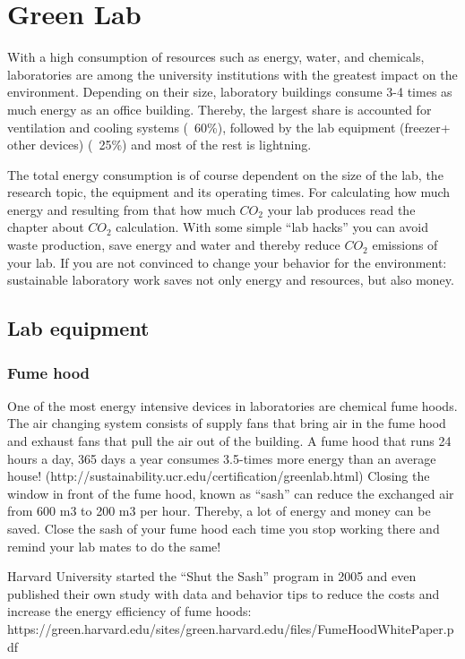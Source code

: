 
\chapter{Green Lab}\label{chap:lab}

With a high consumption of resources such as energy, water, and chemicals, laboratories are among the university institutions with the greatest impact on the environment. Depending on their size, laboratory buildings consume 3-4 times as much energy as an office building. Thereby, the largest share is accounted for ventilation and cooling systems (~60\%), followed by the lab equipment (freezer+ other devices) (~25\%) and most of the rest is lightning. 

The total energy consumption is of course dependent on the size of the lab, the research topic, the equipment and its operating times. For calculating how much energy and resulting from that how much $CO_2$ your lab produces read the chapter about $CO_{2}$ calculation. 
With some simple “lab hacks” you can avoid waste production, save energy and water and thereby reduce $CO_{2}$ emissions of your lab. 
If you are not convinced to change your behavior for the environment: sustainable laboratory work saves not only energy and resources, but also money.

\section{Lab equipment}

\subsection{Fume hood}
One of the most energy intensive devices in laboratories are chemical fume hoods. The air changing system consists of supply fans that bring air in the fume hood and exhaust fans that pull the air out of the building.  A fume hood that runs 24 hours a day, 365 days a year consumes 3.5-times more energy than an average house! (http://sustainability.ucr.edu/certification/greenlab.html) Closing the window in front of the fume hood, known as “sash” can reduce the exchanged air from 600 m3 to 200 m3 per hour. Thereby, a lot of energy and money can be saved.
Close the sash of your fume hood each time you stop working there and remind your lab mates to do the same! 


Harvard University started the “Shut the Sash” program in 2005 and even published their own study with data and behavior tips to reduce the costs and increase the energy efficiency of fume hoods:      
https://green.harvard.edu/sites/green.harvard.edu/files/FumeHoodWhitePaper.pdf

